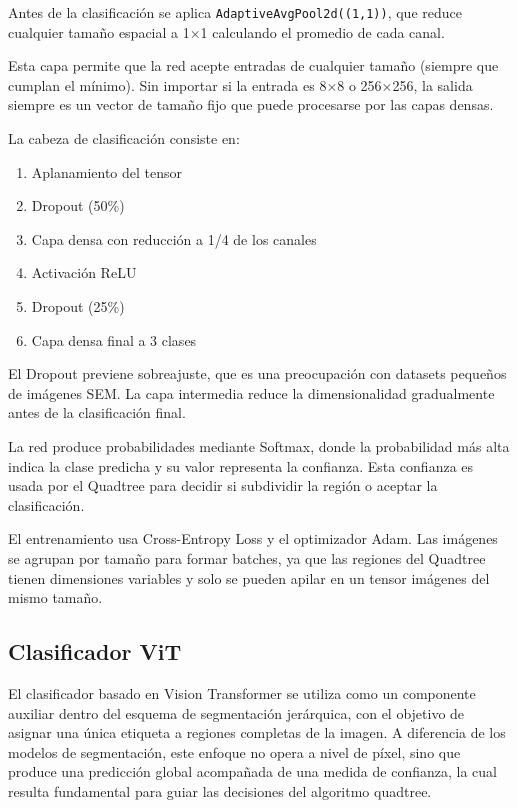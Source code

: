 \documentclass[onecolumn, 12pt , journal]{IEEEtran}
\begin{document}

Antes de la clasificación se aplica \texttt{AdaptiveAvgPool2d((1,1))}, que 
reduce cualquier tamaño espacial a 1×1 calculando el promedio de cada canal.

Esta capa permite que la red acepte entradas de cualquier tamaño (siempre que 
cumplan el mínimo). Sin importar si la entrada es 8×8 o 256×256, la salida 
siempre es un vector de tamaño fijo que puede procesarse por las capas 
densas.


La cabeza de clasificación consiste en:

\begin{enumerate}
    \item Aplanamiento del tensor
    \item Dropout (50\%)
    \item Capa densa con reducción a 1/4 de los canales
    \item Activación ReLU
    \item Dropout (25\%)
    \item Capa densa final a 3 clases
\end{enumerate}

El Dropout previene sobreajuste, que es una preocupación con datasets pequeños 
de imágenes SEM. La capa intermedia reduce la dimensionalidad gradualmente 
antes de la clasificación final.


La red produce probabilidades mediante Softmax, donde la probabilidad más alta 
indica la clase predicha y su valor representa la confianza. Esta confianza es 
usada por el Quadtree para decidir si subdividir la región o aceptar la 
clasificación.


El entrenamiento usa Cross-Entropy Loss y el optimizador Adam. Las imágenes se 
agrupan por tamaño para formar batches, ya que las regiones del Quadtree tienen 
dimensiones variables y solo se pueden apilar en un tensor imágenes del mismo 
tamaño.

\subsection{Clasificador ViT}

El clasificador basado en Vision Transformer se utiliza como un componente auxiliar dentro del esquema de segmentación jerárquica, con el objetivo de asignar una única etiqueta a regiones completas de la imagen. A diferencia de los modelos de segmentación, este enfoque no opera a nivel de píxel, sino que produce una predicción global acompañada de una medida de confianza, la cual resulta fundamental para guiar las decisiones del algoritmo quadtree.
\end{document}
